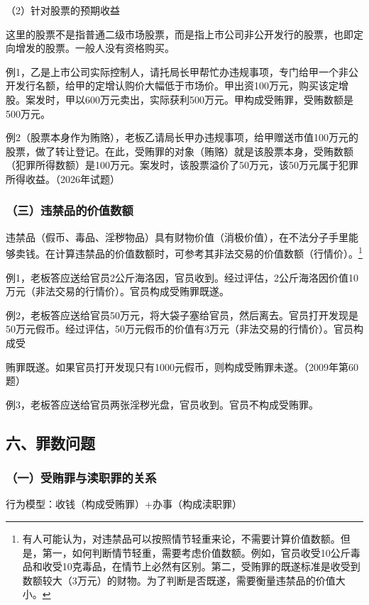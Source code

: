 （2）针对股票的预期收益

这里的股票不是指普通二级市场股票，而是指上市公司非公开发行的股票，也即定向增发的股票。一般人没有资格购买。

例1，乙是上市公司实际控制人，请托局长甲帮忙办违规事项，专门给甲一个非公开发行名额，给甲的定增认购价大幅低于市场价。甲出资100万元，购买该定增股。案发时，甲以600万元卖出，实际获利500万元。甲构成受贿罪，受贿数额是500万元。

例2（股票本身作为贿赂），老板乙请局长甲办违规事项，给甲赠送市值100万元的股票，做了转让登记。在此，受贿罪的对象（贿赂）就是该股票本身，受贿数额（犯罪所得数额）是100万元。案发时，该股票溢价了50万元，该50万元属于犯罪所得收益。（2026年试题）

\subsubsection*{（三）违禁品的价值数额}

违禁品（假币、毒品、淫秽物品）具有财物价值（消极价值），在不法分子手里能够卖钱。在计算违禁品的价值数额时，可参考其非法交易的价值数额（行情价）。\footnote{有人可能认为，对违禁品可以按照情节轻重来论，不需要计算价值数额。但是，第一，如何判断情节轻重，需要考虑价值数额。例如，官员收受10公斤毒品和收受10克毒品，在情节上必然有区别。第二，受贿罪的既遂标准是收受到数额较大（3万元）的财物。为了判断是否既遂，需要衡量违禁品的价值大小。}

例1，老板答应送给官员2公斤海洛因，官员收到。经过评估，2公斤海洛因价值10万元（非法交易的行情价）。官员构成受贿罪既遂。

例2，老板答应送给官员50万元，将大袋子塞给官员，然后离去。官员打开发现是50万元假币。经过评估，50万元假币的价值有3万元（非法交易的行情价）。官员构成受

贿罪既遂。如果官员打开发现只有1000元假币，则构成受贿罪未遂。（2009年第60题）

例3，老板答应送给官员两张淫秽光盘，官员收到。官员不构成受贿罪。

\subsection*{六、罪数问题}

\subsubsection*{（一）受贿罪与渎职罪的关系}

行为模型：收钱（构成受贿罪）+办事（构成渎职罪）

